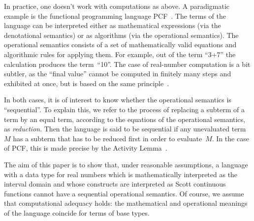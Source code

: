 \documentclass[12pt]{article}
\begin{document}
In practice, one doesn't work with computations as above. A
paradigmatic example is the functional programming language
PCF~\cite{plotkin:lcf}.  The terms of the language can be interpreted
either as mathematical expressions (via the denotational semantics) or
as algorithms (via the operational semantics).  The operational
semantics consists of a set of mathematically valid equations and
algorithmic rules for applying them. For example, out of the term
``3+7'' the calculation produces the term~``10''.  The case of
real-number computation is a bit subtler, as the ``final value''
cannot be computed in finitely many steps and exhibited at once, but
is based on the same principle~\cite{escardo:pcf}.

In both cases, it is of interest to know whether the operational
semantics is ``sequential''. To explain this, we refer to the process
of replacing a subterm of a term by an equal term, according to the
equations of the operational semantics, as \emph{reduction}.  Then the
language is said to be sequential if any unevaluated term~$M$ has a
subterm that has to be reduced first in order to evaluate~$M$.  In the
case of PCF, this is made precise by the Activity
Lemma~\cite{plotkin:lcf}.

The aim of this paper is to show that, under reasonable assumptions, a
language with a data type for real numbers which is mathematically
interpreted as the interval domain and whose constructs are
interpreted as Scott continuous functions cannot have a sequential
operational semantics.  Of course, we assume that computational
adequacy holds: the mathematical and operational meanings 
of the language coincide for terms of base types.
\end{document}
